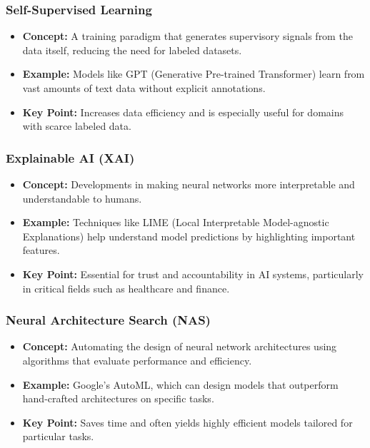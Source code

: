 \documentclass[aspectratio=169]{beamer}
\begin{document}
\begin{frame}[fragile]
    \frametitle{Self-Supervised Learning}
    \begin{itemize}
        \item \textbf{Concept:} A training paradigm that generates supervisory signals from the data itself, reducing the need for labeled datasets.
        \item \textbf{Example:} Models like GPT (Generative Pre-trained Transformer) learn from vast amounts of text data without explicit annotations.
        \item \textbf{Key Point:} Increases data efficiency and is especially useful for domains with scarce labeled data.
    \end{itemize}
\end{frame}

\begin{frame}[fragile]
    \frametitle{Explainable AI (XAI)}
    \begin{itemize}
        \item \textbf{Concept:} Developments in making neural networks more interpretable and understandable to humans.
        \item \textbf{Example:} Techniques like LIME (Local Interpretable Model-agnostic Explanations) help understand model predictions by highlighting important features.
        \item \textbf{Key Point:} Essential for trust and accountability in AI systems, particularly in critical fields such as healthcare and finance.
    \end{itemize}
\end{frame}

\begin{frame}[fragile]
    \frametitle{Neural Architecture Search (NAS)}
    \begin{itemize}
        \item \textbf{Concept:} Automating the design of neural network architectures using algorithms that evaluate performance and efficiency.
        \item \textbf{Example:} Google’s AutoML, which can design models that outperform hand-crafted architectures on specific tasks.
        \item \textbf{Key Point:} Saves time and often yields highly efficient models tailored for particular tasks.
    \end{itemize}
\end{frame}
\end{document}

